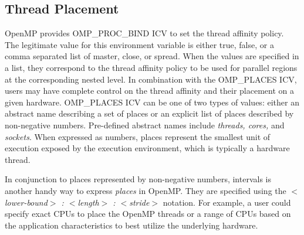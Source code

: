 \subsection{Thread Placement}
OpenMP provides OMP\_PROC\_BIND ICV to set the thread affinity policy. The legitimate value for 
this environment variable is either true, false, or a comma separated list of master, close, or spread. 
When the values are specified in a list, they correspond to the thread affinity policy to be used for 
parallel regions at the corresponding nested level. In combination with the OMP\_PLACES ICV, 
users may have complete control on the thread affinity and their placement on a given hardware. 
OMP\_PLACES ICV can be one of two types of values: either an abstract name describing a set 
of places or an explicit list of places described by non-negative numbers. Pre-defined abstract 
names include \textit{threads, cores,} and \textit{sockets}. When expressed as numbers, places 
represent the smallest unit of execution exposed by the execution environment, which is typically 
a hardware thread.

In conjunction to places represented by non-negative numbers, intervals is another handy way to 
express \textit{places} in OpenMP. They are specified using the \textit{$<$lower-bound$>$ : $<$length$>$ : $<$stride$>$} notation. For example, a user could specify exact CPUs to place the OpenMP threads or a range of CPUs based on the application characteristics to best utilize the underlying hardware.

